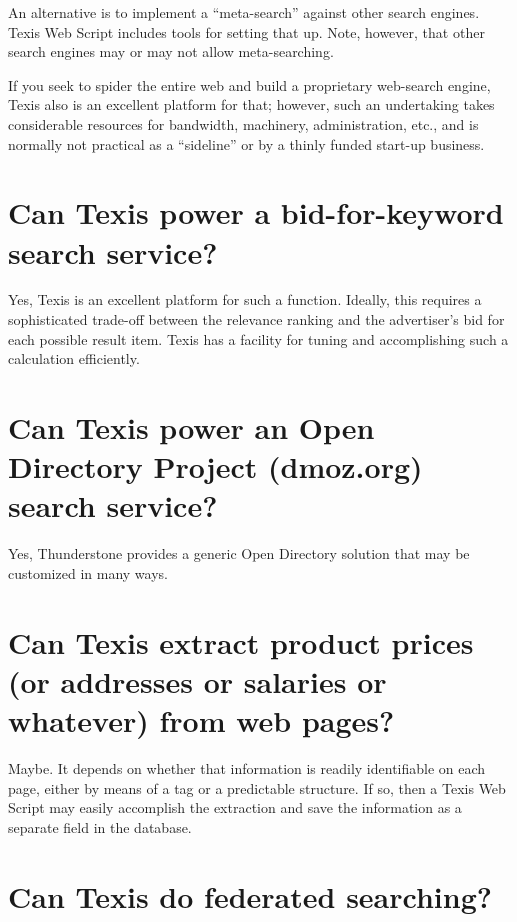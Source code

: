 An alternative is to implement a ``meta-search'' against other search
engines.  Texis Web Script includes tools for setting that up.  Note,
however, that other search engines may or may not allow
meta-searching.

If you seek to spider the entire web and build a proprietary
web-search engine, Texis also is an excellent platform for that;
however, such an undertaking takes considerable resources for
bandwidth, machinery, administration, etc., and is normally not
practical as a ``sideline'' or by a thinly funded start-up business.

\section{Can Texis power a bid-for-keyword search service? }

Yes, Texis is an excellent platform for such a function.  Ideally,
this requires a sophisticated trade-off between the relevance ranking
and the advertiser's bid for each possible result item.  Texis has a
facility for tuning and accomplishing such a calculation efficiently.

\section{Can Texis power an Open Directory Project (dmoz.org) search service? }

Yes, Thunderstone provides a generic Open Directory solution that may
be customized in many ways.

\section{Can Texis extract product prices (or addresses or salaries or whatever) from web pages? }

Maybe.  It depends on whether that information is readily identifiable
on each page, either by means of a tag or a predictable structure.  If
so, then a Texis Web Script may easily accomplish the extraction and
save the information as a separate field in the database.

\section{Can Texis do federated searching? }

